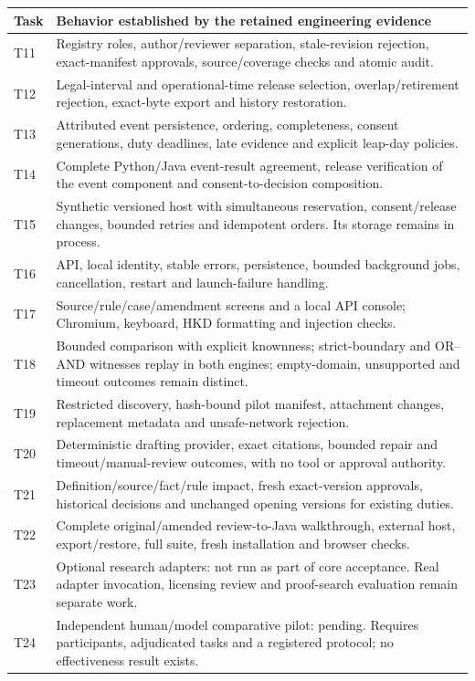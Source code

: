 \endgroup
\begin{longtable}{@{}P{0.09\textwidth}P{0.86\textwidth}@{}}

\toprule Task & Behavior established by the retained engineering evidence \\\midrule
\endhead
T11 & Registry roles, author/reviewer separation, stale-revision rejection, exact-manifest approvals, source/coverage checks and atomic audit.\\
T12 & Legal-interval and operational-time release selection, overlap/retirement rejection, exact-byte export and history restoration.\\
T13 & Attributed event persistence, ordering, completeness, consent generations, duty deadlines, late evidence and explicit leap-day policies.\\
T14 & Complete Python/Java event-result agreement, release verification of the event component and consent-to-decision composition.\\
T15 & Synthetic versioned host with simultaneous reservation, consent/release changes, bounded retries and idempotent orders. Its storage remains in process.\\
T16 & API, local identity, stable errors, persistence, bounded background jobs, cancellation, restart and launch-failure handling.\\
T17 & Source/rule/case/amendment screens and a local API console; Chromium, keyboard, HKD formatting and injection checks.\\
T18 & Bounded comparison with explicit knownness; strict-boundary and OR--AND witnesses replay in both engines; empty-domain, unsupported and timeout outcomes remain distinct.\\
T19 & Restricted discovery, hash-bound pilot manifest, attachment changes, replacement metadata and unsafe-network rejection.\\
T20 & Deterministic drafting provider, exact citations, bounded repair and timeout/manual-review outcomes, with no tool or approval authority.\\
T21 & Definition/source/fact/rule impact, fresh exact-version approvals, historical decisions and unchanged opening versions for existing duties.\\
T22 & Complete original/amended review-to-Java walkthrough, external host, export/restore, full suite, fresh installation and browser checks.\\
T23 & Optional research adapters: not run as part of core acceptance. Real adapter invocation, licensing review and proof-search evaluation remain separate work.\\
T24 & Independent human/model comparative pilot: pending. Requires participants, adjudicated tasks and a registered protocol; no effectiveness result exists.\\
\bottomrule
\end{longtable}
\endgroup

